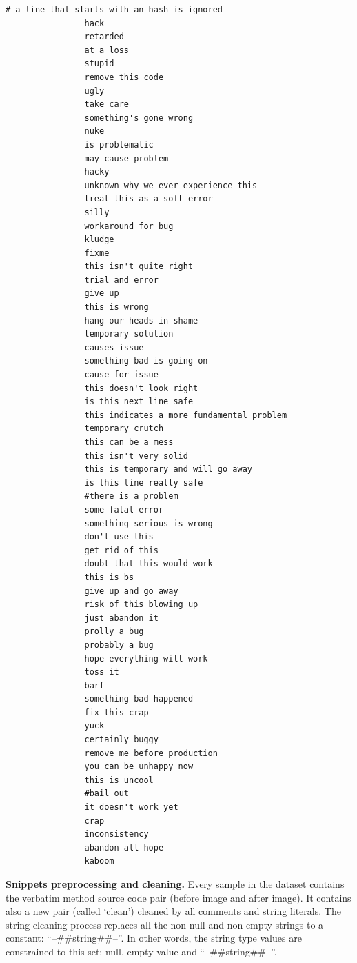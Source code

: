 \begin{lstlisting}[caption={61 patterns for SATD detection}, label={lst:patterns61}]
                # a line that starts with an hash is ignored
                hack
                retarded
                at a loss
                stupid
                remove this code
                ugly
                take care
                something's gone wrong
                nuke
                is problematic
                may cause problem
                hacky
                unknown why we ever experience this
                treat this as a soft error
                silly
                workaround for bug
                kludge
                fixme
                this isn't quite right
                trial and error
                give up
                this is wrong
                hang our heads in shame
                temporary solution
                causes issue
                something bad is going on
                cause for issue
                this doesn't look right
                is this next line safe
                this indicates a more fundamental problem
                temporary crutch
                this can be a mess
                this isn't very solid
                this is temporary and will go away
                is this line really safe
                #there is a problem
                some fatal error
                something serious is wrong
                don't use this
                get rid of this
                doubt that this would work
                this is bs
                give up and go away
                risk of this blowing up
                just abandon it
                prolly a bug
                probably a bug
                hope everything will work
                toss it
                barf
                something bad happened
                fix this crap
                yuck
                certainly buggy
                remove me before production
                you can be unhappy now
                this is uncool
                #bail out
                it doesn't work yet
                crap
                inconsistency
                abandon all hope
                kaboom
\end{lstlisting}

\textbf{Snippets preprocessing and cleaning.} \label{sec:cleaning} Every sample in the dataset contains the verbatim method source code pair (before image and after image). It contains also a new pair (called `clean') cleaned by all comments and string literals. The string cleaning process replaces all the non-null and non-empty strings to a constant: ``--##string##--''. In other words, the string type values are constrained to this set: null, empty value and ``--##string##--''.


